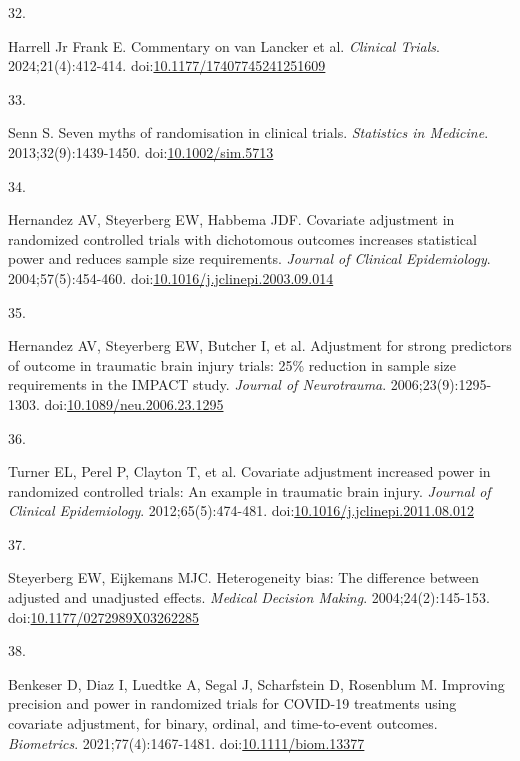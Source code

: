 \documentclass[
  11pt,
]{article}
\newlength{\cslhangindent}
\newlength{\csllabelwidth}
\newenvironment{CSLReferences}[2] %
 {\begin{list}{}{%
  \setlength{\itemindent}{0pt}
  \setlength{\leftmargin}{0pt}
  \setlength{\parsep}{0pt}
  \ifodd #1
   \setlength{\leftmargin}{\cslhangindent}
   \setlength{\itemindent}{-1\cslhangindent}
  \fi
  \setlength{\itemsep}{#2\baselineskip}}}
 {\end{list}}
\newcommand{\CSLLeftMargin}[1]{\parbox[t]{\csllabelwidth}{\strut#1\strut}}
\newcommand{\CSLRightInline}[1]{\parbox[t]{\linewidth - \csllabelwidth}{\strut#1\strut}}
\begin{document}
\begin{CSLReferences}{0}{1}
\CSLLeftMargin{32. }%
\CSLRightInline{Harrell Jr Frank E. Commentary on van {Lancker} et al. \emph{Clinical Trials}. 2024;21(4):412-414. doi:\href{https://doi.org/10.1177/17407745241251609}{10.1177/17407745241251609}}

\CSLLeftMargin{33. }%
\CSLRightInline{Senn S. Seven myths of randomisation in clinical trials. \emph{Statistics in Medicine}. 2013;32(9):1439-1450. doi:\href{https://doi.org/10.1002/sim.5713}{10.1002/sim.5713}}

\CSLLeftMargin{34. }%
\CSLRightInline{Hernandez AV, Steyerberg EW, Habbema JDF. Covariate adjustment in randomized controlled trials with dichotomous outcomes increases statistical power and reduces sample size requirements. \emph{Journal of Clinical Epidemiology}. 2004;57(5):454-460. doi:\href{https://doi.org/10.1016/j.jclinepi.2003.09.014}{10.1016/j.jclinepi.2003.09.014}}

\CSLLeftMargin{35. }%
\CSLRightInline{{Hernandez AV, Steyerberg EW, Butcher I, et al.} Adjustment for strong predictors of outcome in traumatic brain injury trials: 25\% reduction in sample size requirements in the {IMPACT} study. \emph{Journal of Neurotrauma}. 2006;23(9):1295-1303. doi:\href{https://doi.org/10.1089/neu.2006.23.1295}{10.1089/neu.2006.23.1295}}

\CSLLeftMargin{36. }%
\CSLRightInline{{Turner EL, Perel P, Clayton T, et al.} Covariate adjustment increased power in randomized controlled trials: An example in traumatic brain injury. \emph{Journal of Clinical Epidemiology}. 2012;65(5):474-481. doi:\href{https://doi.org/10.1016/j.jclinepi.2011.08.012}{10.1016/j.jclinepi.2011.08.012}}

\CSLLeftMargin{37. }%
\CSLRightInline{Steyerberg EW, Eijkemans MJC. Heterogeneity bias: The difference between adjusted and unadjusted effects. \emph{Medical Decision Making}. 2004;24(2):145-153. doi:\href{https://doi.org/10.1177/0272989X03262285}{10.1177/0272989X03262285}}

\CSLLeftMargin{38. }%
\CSLRightInline{Benkeser D, Diaz I, Luedtke A, Segal J, Scharfstein D, Rosenblum M. Improving precision and power in randomized trials for {COVID-19} treatments using covariate adjustment, for binary, ordinal, and time-to-event outcomes. \emph{Biometrics}. 2021;77(4):1467-1481. doi:\href{https://doi.org/10.1111/biom.13377}{10.1111/biom.13377}}


\end{CSLReferences}
\end{document}
